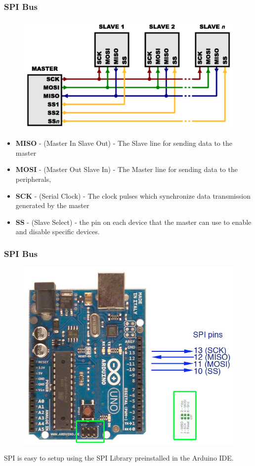 
\begin{frame}
	\frametitle{SPI Bus}
	\begin{figure}
		\includegraphics[scale=.15]{assets/spi}  
	\end{figure}
	\begin{itemize}
		\item \textbf{MISO} - (Master In Slave Out) - The Slave line for sending data to the master
		\item \textbf{MOSI} -  (Master Out Slave In) - The Master line for sending data to the peripherals,
		\item \textbf{SCK} - (Serial Clock) - The clock pulses which synchronize data transmission generated by the master
		\item \textbf{SS} - (Slave Select) - the pin on each device that the master can use to enable and disable specific devices.
	\end{itemize}
\end{frame}

\begin{frame}
	\frametitle{SPI Bus}
	\begin{figure}
		\includegraphics[scale=.25]{assets/spiarduino}  
	\end{figure}
	SPI is easy to setup using the SPI Library preinstalled in the Arduino IDE.
\end{frame}


